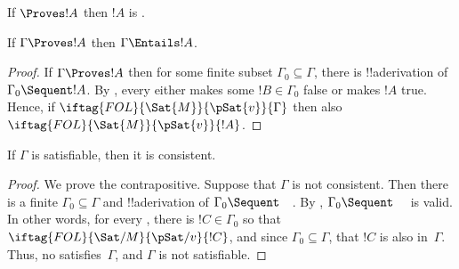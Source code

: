 \documentclass[../../../include/open-logic-section]{subfiles}
\begin{document}
\begin{cor}
If $\Proves !A$ then $!A$ is .
\end{cor}

\begin{cor}
If $\Gamma \Proves !A$ then $\Gamma \Entails !A$.
\end{cor}

\begin{proof}
If $\Gamma \Proves !A$ then for some finite subset $\Gamma_0 \subseteq
\Gamma$, there is !!a{derivation} of $\Gamma_0 \Sequent !A$.  By
, every
either makes some $!B \in \Gamma_0$ false or makes $!A$ true.  Hence,
if $\iftag{FOL}{\Sat{M}}{\pSat{v}}{\Gamma}$ then also
$\iftag{FOL}{\Sat{M}}{\pSat{v}}{!A}$.
\end{proof}

\begin{cor}
If $\Gamma$ is satisfiable, then it is consistent.
\end{cor}

\begin{proof}
We prove the contrapositive.  Suppose that $\Gamma$ is not consistent.
Then there is a finite $\Gamma_0 \subseteq \Gamma$ and !!a{derivation}
of $\Gamma_0 \Sequent \quad$.  By ,
$\Gamma_0 \Sequent \quad$ is valid.  In other words, for every
,
there is $!C \in \Gamma_0$ so that
$\iftag{FOL}{\Sat/{M}}{\pSat/{v}}{!C}$, and since $\Gamma_0
\subseteq \Gamma$, that $!C$ is also in~$\Gamma$.  Thus, no
 satisfies~$\Gamma$, and
$\Gamma$ is not satisfiable.
\end{proof}
\end{document}
